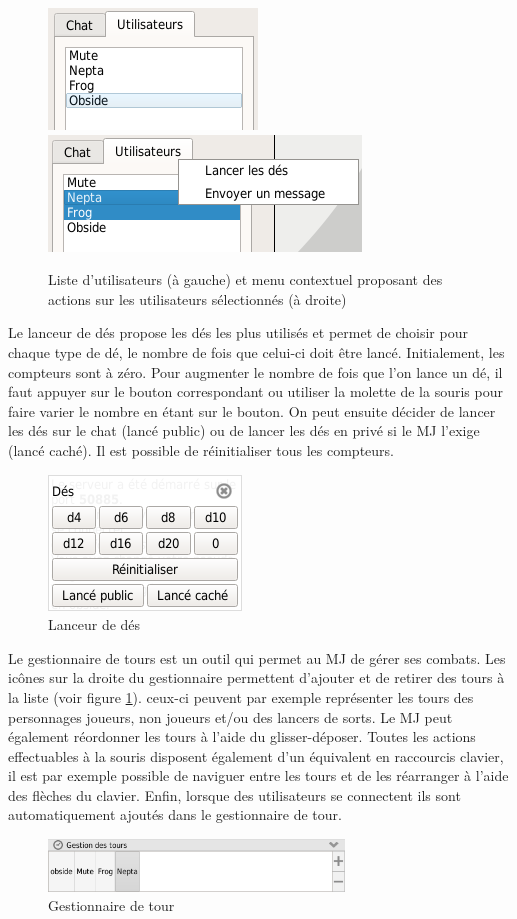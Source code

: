 \begin{figure}[h!]
	\centering
	\includegraphics[scale=0.5]{img/chat_userlist_1.png}
	\hspace{10 mm}
	\includegraphics[scale=0.5]{img/chat_userlist_2.png}
	\caption{Liste d'utilisateurs (à gauche) et menu contextuel proposant des actions sur les utilisateurs sélectionnés (à droite)}
\end{figure}

Le lanceur de dés propose les dés les plus utilisés et permet de choisir pour chaque type de dé, le nombre de fois que celui-ci doit être lancé. Initialement, les compteurs sont à zéro. Pour augmenter le nombre de fois que l'on lance un dé, il faut appuyer sur le bouton correspondant ou utiliser la molette de la souris pour faire varier le nombre en étant sur le bouton. On peut ensuite décider de lancer les dés sur le chat (lancé public) ou de lancer les dés en privé si le MJ l'exige (lancé caché). Il est possible de réinitialiser tous les compteurs.

\begin{figure}[h!]
	\centering
	\includegraphics[scale=0.5]{img/dice_manager.png}
	\caption{Lanceur de dés}
\end{figure}

Le gestionnaire de tours est un outil qui permet au MJ de gérer ses combats. Les icônes sur la droite du gestionnaire permettent d'ajouter et de retirer des tours à la liste (voir figure \ref{fig:turnManager}). ceux-ci peuvent par exemple représenter les tours des personnages joueurs, non joueurs et/ou des lancers de sorts. Le MJ peut également réordonner les tours à l'aide du glisser-déposer. Toutes les actions effectuables à la souris disposent également d'un équivalent en raccourcis clavier, il est par exemple possible de naviguer entre les tours et de les réarranger à l'aide des flèches du clavier. Enfin, lorsque des utilisateurs se connectent ils sont automatiquement ajoutés dans le gestionnaire de tour.

\begin{figure}[h!]
	\centering
	\includegraphics[width=0.7\textwidth]{img/turn_manager.png}
	\caption{Gestionnaire de tour}
	\label{fig:turnManager}
\end{figure}